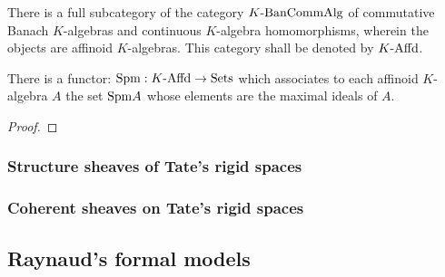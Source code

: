             \begin{corollary}
                There is a full subcategory of the category $K\text{-}\mathrm{Ban}\mathrm{Comm}\mathrm{Alg}$ of commutative Banach $K$-algebras and continuous $K$-algebra homomorphisms, wherein the objects are affinoid $K$-algebras. This category shall be denoted by $K\text{-}\mathrm{Affd}$.
            \end{corollary}
            \begin{proposition} \label{prop: maximal_spectra_of_affinoid_algebras}
                There is a functor: $\mathrm{Spm}: K\text{-}\mathrm{Affd} \to \mathrm{Sets}$ which associates to each affinoid $K$-algebra $A$ the set $\mathrm{Spm} A$ whose elements are the maximal ideals of $A$. 
            \end{proposition}
                \begin{proof}
                    
                \end{proof}
        
        \subsubsection{Structure sheaves of Tate's rigid spaces}
        
        \subsubsection{Coherent sheaves on Tate's rigid spaces}
    
    \subsection{Raynaud's formal models}
